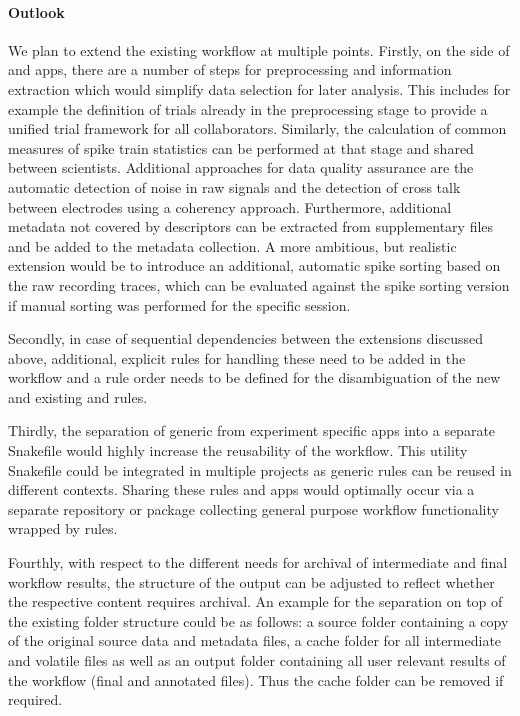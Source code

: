 \paragraph{Outlook}
We plan to extend the existing workflow at multiple points. Firstly, on the side of  and  apps, there are a number of  steps for preprocessing and information extraction which would simplify data selection for later analysis. This includes for example the definition of trials already in the preprocessing stage to provide a unified trial framework for all collaborators. Similarly, the calculation of common measures of spike train statistics can be performed at that stage and shared between scientists. Additional approaches for data quality assurance are the automatic detection of noise in raw signals and the detection of cross talk between electrodes using a coherency approach. Furthermore, additional metadata not covered by descriptors can be extracted from supplementary files and be added to the metadata collection. A more ambitious, but realistic extension would be to introduce an additional, automatic spike sorting based on the raw recording traces, which can be evaluated against the spike sorting version if manual sorting was performed for the specific session. 

Secondly, in case of sequential dependencies between the extensions discussed above, additional, explicit rules for handling these need to be added in the workflow and a rule order needs to be defined for the disambiguation of the new and existing  and  rules.

Thirdly, the separation of generic from experiment specific apps into a separate Snakefile would highly increase the reusability of the workflow. This utility Snakefile could be integrated in multiple projects as generic rules can be reused in different contexts. Sharing these  rules and apps would optimally occur via a separate repository or package collecting general purpose workflow functionality wrapped by  rules.

Fourthly, with respect to the different needs for archival of intermediate and final workflow results, the structure of the output can be adjusted to reflect whether the respective content requires archival. An example for the separation on top of the existing folder structure could be as follows: a source folder containing a copy of the original source data and metadata files, a cache folder for all intermediate and volatile files as well as an output folder containing all user relevant results of the workflow (final  and annotated  files). Thus the cache folder can be removed if required.

